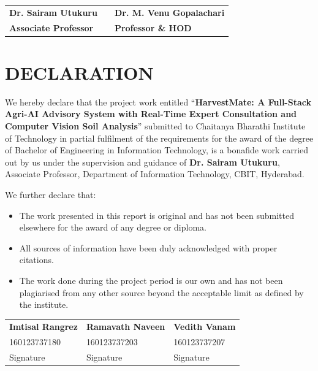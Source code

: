 \documentclass[12pt,a4paper]{report}
\begin{document}
\vspace{4cm}

\begin{table}[h!]
    \centering
    \begin{tabular}{l p{2.5cm} l}
        \textbf{Dr. Sairam Utukuru} && \textbf{Dr. M. Venu Gopalachari}\\
        \textbf{Associate Professor} & & \textbf{Professor \& HOD}\\
    \end{tabular}
\end{table}

\clearpage


\chapter*{DECLARATION}

We hereby declare that the project work entitled ``\textbf{HarvestMate: A Full-Stack Agri-AI Advisory System with Real-Time Expert Consultation and Computer Vision Soil Analysis}'' submitted to Chaitanya Bharathi Institute of Technology in partial fulfilment of the requirements for the award of the degree of Bachelor of Engineering in Information Technology, is a bonafide work carried out by us under the supervision and guidance of \textbf{Dr. Sairam Utukuru}, Associate Professor, Department of Information Technology, CBIT, Hyderabad.

We further declare that:
\begin{itemize}
    \item The work presented in this report is original and has not been submitted elsewhere for the award of any degree or diploma.
    \item All sources of information have been duly acknowledged with proper citations.
    \item The work done during the project period is our own and has not been plagiarised from any other source beyond the acceptable limit as defined by the institute.
\end{itemize}

\vspace{2cm}

\noindent
\begin{tabularx}{\textwidth}{@{}X X X@{}}
\textbf{Imtisal Rangrez} & \textbf{Ramavath Naveen} & \textbf{Vedith Vanam} \\
160123737180 & 160123737203 & 160123737207 \\[4ex]
Signature \underline{\hspace{2.5cm}} & Signature \underline{\hspace{2.5cm}} & Signature \underline{\hspace{2.5cm}}
\end{tabularx}
\end{document}
